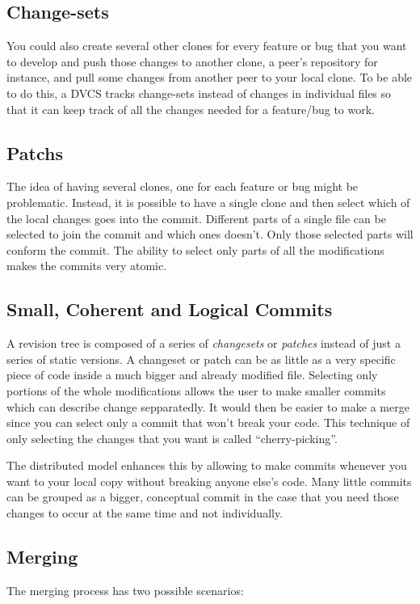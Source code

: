 \documentclass[a4paper,10pt]{article}
\begin{document}
\subsection{Change-sets}
You could also create several other clones for every feature or bug that you want to develop and push those changes to another clone, a peer's repository for instance, and pull some changes from another peer to your local clone. To be able to do this, a DVCS tracks change-sets instead of changes in individual files so that it can keep track of all the changes needed for a feature/bug to work.


\subsection{Patchs}
The idea of having several clones, one for each feature or bug might be problematic. Instead, it is possible to have a single clone and then select
which of the local changes goes into the commit. Different parts of a single file can be selected to join the commit and which ones doesn't. Only those selected parts will conform the commit. The ability to select only parts of all the modifications makes the commits very atomic.


\subsection{Small, Coherent and Logical Commits}
A revision tree is composed of a series of \emph{changesets} or \emph{patches} instead of just a series of static versions. A changeset or patch
can be as little as a very specific piece of code inside a much bigger and already modified file. Selecting only portions of the whole modifications
allows the user to make smaller commits which can describe change sepparatedly. It would then be easier to make a merge since you can select
only a commit that won't break your code. This technique of only selecting the changes that you want is called ``cherry-picking''.

The distributed model enhances this by allowing to make commits whenever you want to your local copy without breaking anyone else's code. Many little commits can be grouped as a bigger, conceptual commit in the case that you need those changes to occur at the same time and not individually. 

\subsection{Merging}
The merging process has two possible scenarios:
\end{document}
